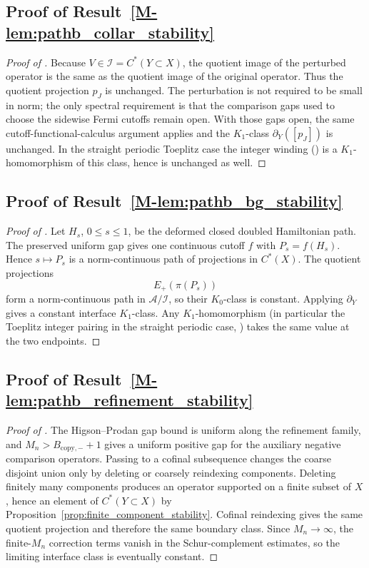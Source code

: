 \documentclass[11pt]{article}
\numberwithin{equation}{section}
\theoremstyle{definition}
\theoremstyle{remark}
\begin{document}
\subsection{Proof of Result~\ref{M-lem:pathb_collar_stability}}\label{app:proof:lem:pathb_collar_stability}
\begin{proof}[Proof of ]
Because \(V\in\mathcal I=C^*(Y\subset X)\), the quotient image of the perturbed operator is the same
as the quotient image of the original operator. Thus the quotient projection \(p_J\) is unchanged.
The perturbation is not required to be small in norm; the only spectral requirement is that the
comparison gaps used to choose the sidewise Fermi cutoffs remain open. With those gaps open, the
same cutoff-functional-calculus argument applies and the \(K_1\)-class
\(\partial_Y([p_J])\) is unchanged. In the straight periodic Toeplitz case the integer
winding () is a \(K_1\)-homomorphism of this class, hence is
unchanged as well.
\end{proof}

\subsection{Proof of Result~\ref{M-lem:pathb_bg_stability}}\label{app:proof:lem:pathb_bg_stability}
\begin{proof}[Proof of ]
Let \(H_s\), \(0\le s\le1\), be the deformed closed doubled Hamiltonian path. The preserved uniform
gap gives one continuous cutoff \(f\) with \(P_s=f(H_s)\). Hence \(s\mapsto P_s\) is a
norm-continuous path of projections in \(C^*(X)\). The quotient projections
\[
E_+(\pi(P_s))
\]
form a norm-continuous path in \(\mathcal A/\mathcal I\), so their \(K_0\)-class is constant. Applying
\(\partial_Y\) gives a constant interface \(K_1\)-class. Any \(K_1\)-homomorphism (in
particular the Toeplitz integer pairing in the straight periodic case,
) takes the same value at the two endpoints.
\end{proof}

\subsection{Proof of Result~\ref{M-lem:pathb_refinement_stability}}\label{app:proof:lem:pathb_refinement_stability}
\begin{proof}[Proof of ]
The Higson--Prodan gap bound is uniform along the refinement family, and
\(M_n>B_{\mathrm{copy},-}+1\) gives a uniform positive gap for the auxiliary negative comparison
operators. Passing to a cofinal subsequence changes the coarse disjoint union only by deleting or
coarsely reindexing components. Deleting finitely many components produces an operator supported on
a finite subset of \(X\), hence an element of \(C^*(Y\subset X)\) by
Proposition~\ref{prop:finite_component_stability}. Cofinal reindexing gives the same quotient
projection and therefore the same boundary class. Since \(M_n\to\infty\), the finite-\(M_n\)
correction terms vanish in the Schur-complement estimates, so the limiting interface class is
eventually constant.
\end{proof}
\end{document}
